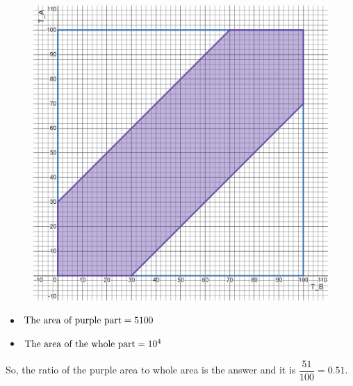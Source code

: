 \begin{figure}[ht!]
  \centering
  \includegraphics[width=.5\textwidth]{img/q2-d.png}
  \caption{}
\end{figure}

\begin{multicols}{2}
  \begin{itemize}
    \item $\textnormal{The area of purple part} = 5100$
    \item $\textnormal{The area of the whole part} = 10^4$
  \end{itemize}
\end{multicols}

So, the ratio of the purple area to whole area is the answer and it is $\dfrac{51}{100} = 0.51$.
